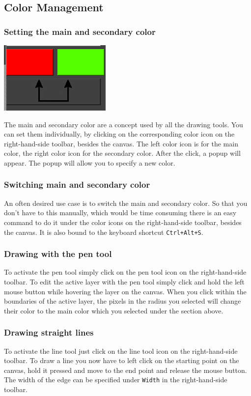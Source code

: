 \documentclass[a4paper, 12pt]{article}
\begin{document}
\subsection{Color Management}
\subsubsection{Setting the main and secondary color}
\begin{center}
\includegraphics[width=0.3\linewidth,keepaspectratio]{assets/change-colors}
\end{center}
The main and secondary color are a concept used by all the drawing tools. You can set them individually, by clicking on the corresponding color icon on the right-hand-side toolbar, besides the canvas. The left color icon is for the main color, the right color icon for the secondary color.
After the click, a popup will appear. The popup will allow you to specify a new color.

\subsubsection{Switching main and secondary color}
An often desired use case is to switch the main and secondary color. So that you don't have to this manually, which would be time consuming there is an easy command to do it under the color icons on the right-hand-side toolbar, besides the canvas.
It is also bound to the keyboard shortcut \texttt{Ctrl+Alt+S}.

\subsubsection{Drawing with the pen tool}
To activate the pen tool simply click on the pen tool icon on the right-hand-side  toolbar.
To edit the active layer with the pen tool simply click and hold the left mouse button while hovering the layer on the canvas. When you click within the boundaries of the active layer, the pixels in the radius you selected will change their color to the main color which you selected under the section above.

\subsubsection{Drawing straight lines}
To activate the line tool just click on the line tool icon on the right-hand-side toolbar.
To draw a line you now have to left click on the starting point on the canvas, hold it pressed and move to the end point and release the mouse button. The width of the edge can be specified under \texttt{Width} in the right-hand-side toolbar.
\end{document}
